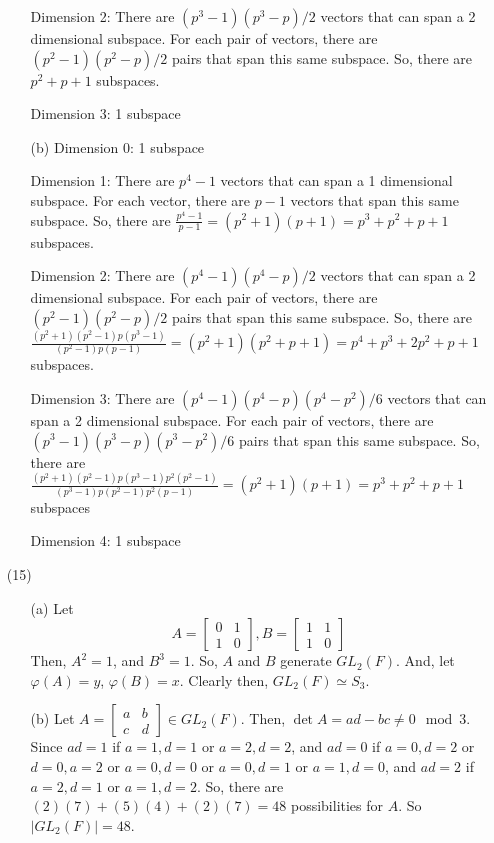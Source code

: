 \begin{itemize}
\begin{itemize}
Dimension 2: There are $(p^3 - 1)(p^3 - p)/2$ vectors that can span a 2 dimensional subspace. For each pair of vectors, there are $(p^2 - 1)(p^2 - p)/2$ pairs that span this same subspace. So, there are $p^2 + p + 1$ subspaces.

Dimension 3: 1 subspace
\item[(b)]
Dimension 0: 1 subspace

Dimension 1: There are $p^4 - 1$ vectors that can span a 1 dimensional subspace. For each vector, there are $p - 1$ vectors that span this same subspace. So, there are $\frac{p^4 - 1}{p - 1} = (p^2 + 1)(p + 1) = p^3 + p^2 + p + 1$ subspaces.

Dimension 2: There are $(p^4 - 1)(p^4 - p)/2$ vectors that can span a 2 dimensional subspace. For each pair of vectors, there are $(p^2 - 1)(p^2 - p)/2$ pairs that span this same subspace. So, there are $\frac{(p^2 + 1)(p^2 - 1)p(p^3 - 1)}{(p^2 - 1)p(p - 1)} = (p^2 + 1)(p^2 + p + 1) = p^4 + p^3 + 2p^2 + p + 1$ subspaces.

Dimension 3: There are $(p^4 - 1)(p^4 - p)(p^4 - p^2)/6$ vectors that can span a 2 dimensional subspace. For each pair of vectors, there are $(p^3 - 1)(p^3 - p)(p^3 - p^2)/6$ pairs that span this same subspace. So, there are $\frac{(p^2 + 1)(p^2 - 1)p(p^3 - 1)p^2(p^2 - 1)}{(p^3 - 1)p(p^2 - 1)p^2(p-1)} = (p^2 + 1)(p + 1) = p^3 + p^2 + p + 1$ subspaces

Dimension 4: 1 subspace
\end{itemize}
\item[(15)]
\begin{itemize}
\item[(a)]
Let
$$A = \begin{bmatrix}
0 & 1 \\
1 & 0
\end{bmatrix}, B = \begin{bmatrix}
1 & 1 \\
1 & 0
\end{bmatrix}$$
Then, $A^2 = 1$, and $B^3 = 1$. So, $A$ and $B$ generate $GL_2(F)$. And, let $\varphi(A) = y$, $\varphi(B) = x$. Clearly then, $GL_2(F) \simeq S_3$.
\item[(b)]
Let $A = \begin{bmatrix}
a & b \\
c & d
\end{bmatrix} \in GL_2(F)$. Then, $\det A = ad - bc \neq 0 \mod 3$. Since $ad = 1$ if $a = 1, d = 1$ or $a = 2, d = 2$, and $ad = 0$ if $a = 0, d = 2$ or $d = 0, a = 2$ or $a = 0, d = 0$ or $a = 0, d = 1$ or $a = 1, d = 0$, and $ad = 2$ if $a = 2, d = 1$ or $a = 1, d = 2$. So, there are $(2)(7) + (5)(4) + (2)(7) = 48$ possibilities for $A$. So $|GL_2(F)| = 48$.


\end{itemize}
\end{itemize}
